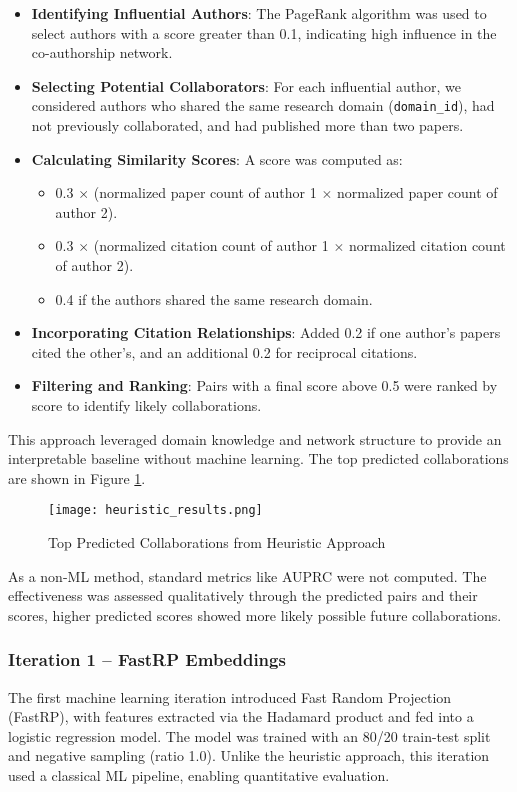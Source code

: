 \documentclass[conference, 12pt]{IEEEtran}
\begin{document}
\begin{itemize}
    \item \textbf{Identifying Influential Authors}: The PageRank algorithm was used to select authors with a score greater than 0.1, indicating high influence in the co-authorship network.
    \item \textbf{Selecting Potential Collaborators}: For each influential author, we considered authors who shared the same research domain (\texttt{domain\_id}), had not previously collaborated, and had published more than two papers.
    \item \textbf{Calculating Similarity Scores}: A score was computed as:
    \begin{itemize}
        \item 0.3 $\times$ (normalized paper count of author 1 $\times$ normalized paper count of author 2).
        \item 0.3 $\times$ (normalized citation count of author 1 $\times$ normalized citation count of author 2).
        \item 0.4 if the authors shared the same research domain.
    \end{itemize}
    \item \textbf{Incorporating Citation Relationships}: Added 0.2 if one author’s papers cited the other’s, and an additional 0.2 for reciprocal citations.
    \item \textbf{Filtering and Ranking}: Pairs with a final score above 0.5 were ranked by score to identify likely collaborations.
\end{itemize}

This approach leveraged domain knowledge and network structure to provide an interpretable baseline without machine learning. The top predicted collaborations are shown in Figure \ref{fig:link_prediction_heuristic}.

\begin{figure}[h]
    \centering
    \texttt{[image: heuristic\_results.png]}
    \caption{Top Predicted Collaborations from Heuristic Approach}
    \label{fig:link_prediction_heuristic}
\end{figure}

As a non-ML method, standard metrics like AUPRC were not computed. The effectiveness was assessed qualitatively through the predicted pairs and their scores, higher predicted scores showed more likely possible future collaborations.

\subsubsection{Iteration 1 -- FastRP Embeddings}
The first machine learning iteration introduced Fast Random Projection (FastRP), with features extracted via the Hadamard product and fed into a logistic regression model. The model was trained with an 80/20 train-test split and negative sampling (ratio 1.0). Unlike the heuristic approach, this iteration used a classical ML pipeline, enabling quantitative evaluation.
\end{document}
